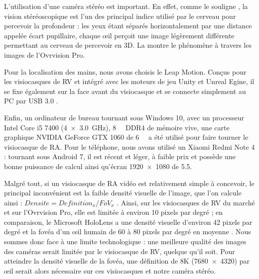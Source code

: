 L'utilisation d'une caméra stéréo est important. En effet, comme le souligne \cite{Bourke1999}, la vision stéréoscopique est l'un des principal indice utilisé par le cerveau pour percevoir la profondeur : les yeux étant séparés horizontalement par une distance appelée écart pupillaire, chaque \oe il perçoit une image légèrement différente permettant au cerveau de percevoir en 3D. La  montre le phénomène à travers les images de l'Ovrvision Pro.

Pour la localisation des mains, nous avons choisis le Leap Motion. Conçus pour les visiocasques de RV et intégré avec les moteurs de jeu Unity et Unreal Egine, il se fixe également sur la face avant du visiocasque et se connecte simplement au PC par USB 3.0 .

Enfin, un ordinateur de bureau tournant sous Windows 10, avec un processeur Intel Core i5 7400 (\SI[product-units = single]{4x3.0}{\GHz}), \SI{8}{\giga\byte} DDR4 de mémoire vive, une carte graphique NVIDIA GeForce GTX 1060 de \SI{6}{\giga\byte} a été utilisé pour faire tourner le visiocasque de RA. Pour le téléphone, nous avons utilisé un Xiaomi Redmi Note 4 : tournant sous Android 7, il est récent et léger, à faible prix et possède une bonne puissance de calcul ainsi qu'écran \SI{1920x1080}{\px} de \SI{5.5}{\inch}.

Malgré tout, si un visiocasque de RA vidéo est relativement simple à concevoir, le principal inconvénient est la faible densité visuelle de l'image, que l'on calcule ainsi : $Densite = Definition_x / FoV_x$ \citep{Boger2017}. Ainsi, sur les visiocasques de RV du marché et sur l'Ovrvision Pro, elle est limitée à environ 10 pixels par degré  ; en comparaison, le Microsoft HoloLens a une densité visuelle d'environ 42 pixels par degré et la fovéa d'un \oe il humain de 60 à 80 pixels par degré en moyenne \citep{Kistner2014}. Nous sommes donc face à une limite technologique : une meilleure qualité des images des caméras serait limitée par le visiocasque de RV, quelque qu'il soit. Pour atteindre la densité visuelle de la fovéa, une définition de 8K (\SI{7680x4320}{\px}) par \oe il serait alors nécessaire sur ces visiocasques et notre caméra stéréo.

